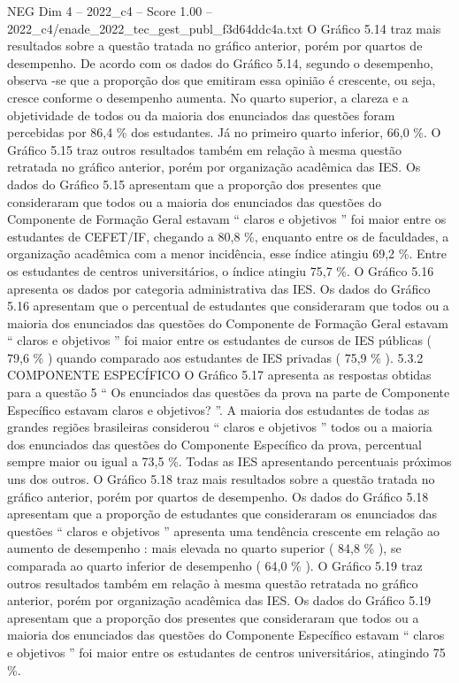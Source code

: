 \begin{textsample}{NEG Dim 4 – 2022\_c4 – Score 1.00 – 2022\_c4/enade\_2022\_tec\_gest\_publ\_f3d64ddc4a.txt}
O Gráfico 5.14 traz mais resultados sobre a questão tratada no gráfico anterior, porém por quartos de desempenho.
De acordo com os dados do Gráfico 5.14, segundo o desempenho, observa -se que a proporção dos que emitiram essa opinião é crescente, ou seja, cresce conforme o desempenho aumenta.
No quarto superior, a clareza e a objetividade de todos ou da maioria dos enunciados das questões foram percebidas por 86,4 \% dos estudantes.
Já no primeiro quarto inferior, 66,0 \%.
O Gráfico 5.15 traz outros resultados também em relação à mesma questão retratada no gráfico anterior, porém por organização acadêmica das IES.
Os dados do Gráfico 5.15 apresentam que a proporção dos presentes que consideraram que todos ou a maioria dos enunciados das questões do Componente de Formação Geral estavam “ claros e objetivos ” foi maior entre os estudantes de CEFET/IF, chegando a 80,8 \%, enquanto entre os de faculdades, a organização acadêmica com a menor incidência, esse índice atingiu 69,2 \%.
Entre os estudantes de centros universitários, o índice atingiu 75,7 \%.
O Gráfico 5.16 apresenta os dados por categoria administrativa das IES.
Os dados do Gráfico 5.16 apresentam que o percentual de estudantes que consideraram que todos ou a maioria dos enunciados das questões do Componente de Formação Geral estavam “ claros e objetivos ” foi maior entre os estudantes de cursos de IES públicas ( 79,6 \% ) quando comparado aos estudantes de IES privadas ( 75,9 \% ). 5.3.2 COMPONENTE ESPECÍFICO O Gráfico 5.17 apresenta as respostas obtidas para a questão 5 “ Os enunciados das questões da prova na parte de Componente Específico estavam claros e objetivos? ”.
A maioria dos estudantes de todas as grandes regiões brasileiras considerou “ claros e objetivos ” todos ou a maioria dos enunciados das questões do Componente Específico da prova, percentual sempre maior ou igual a 73,5 \%.
Todas as IES apresentando percentuais próximos uns dos outros.
O Gráfico 5.18 traz mais resultados sobre a questão tratada no gráfico anterior, porém por quartos de desempenho.
Os dados do Gráfico 5.18 apresentam que a proporção de estudantes que consideraram os enunciados das questões “ claros e objetivos ” apresenta uma tendência crescente em relação ao aumento de desempenho : mais elevada no quarto superior ( 84,8 \% ), se comparada ao quarto inferior de desempenho ( 64,0 \% ).
O Gráfico 5.19 traz outros resultados também em relação à mesma questão retratada no gráfico anterior, porém por organização acadêmica das IES.
Os dados do Gráfico 5.19 apresentam que a proporção dos presentes que consideraram que todos ou a maioria dos enunciados das questões do Componente Específico estavam “ claros e objetivos ” foi maior entre os estudantes de centros universitários, atingindo 75 \%.

\end{textsample}

